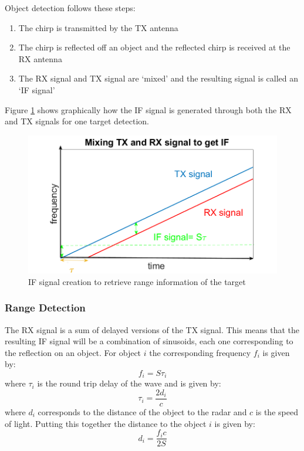 

Object detection follows these steps:
\begin{enumerate}
    \item The chirp is transmitted by the TX antenna
    \item The chirp is reflected off an object and the reflected chirp is received at the RX antenna
    \item The RX signal and TX signal are ‘mixed’ and the resulting signal is called an ‘\ac{IF} signal’
\end{enumerate}
Figure \ref{fig:if} shows graphically how the IF signal is generated through both the RX and TX signals for one target detection.
\begin{figure}[ht] 
\centerline{\includegraphics [width=0.8 \textwidth]{imgs/chapter2/IFsignal.png}}
\caption{IF signal creation to retrieve range information of the target}
\label{fig:if}
\end{figure}

\subsubsection{Range Detection}
The RX signal is a sum of delayed versions of the TX signal. This means that the resulting \ac{IF} signal will be a combination of sinusoids, each one corresponding to the reflection on an object. For object $i$ the corresponding frequency $f_i$ is given by:
\begin{equation}
    f_i=S\tau_i
\end{equation}
where $\tau_i$ is the round trip delay of the wave and is given by:
\begin{equation}
    \tau_i=\frac{2d_i}{c}
\end{equation}
where $d_i$ corresponds to the distance of the object to the radar and $c$ is the speed of light.
Putting this together the distance to the object $i$ is given by:
\begin{equation}
    d_i=\frac{f_ic}{2S}
    \label{eq:1}
\end{equation}


